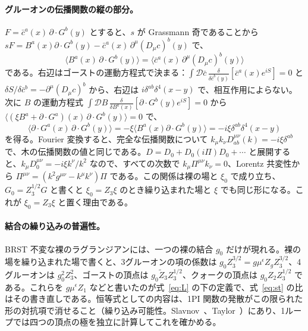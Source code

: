 \documentclass[a4paper,10pt]{ltjsarticle}
\begin{document}
\paragraph{グルーオンの伝播関数の縦の部分。}$F=\bar c^a(x)\,\partial\!\cdot\!G^b(y)$ とすると、$s$ が Grassmann 奇であることから $sF=B^a(x)\partial\!\cdot\!G^b(y)-\bar c^a(x)\,\partial^\mu(D_\mu c)^b(y)$ で、
\begin{equation*}
\langle B^a(x)\,\partial\!\cdot\!G^b(y)\rangle=\langle\bar c^a(x)\,\partial^\mu(D_\mu c)^b(y)\rangle
\end{equation*}
である。右辺はゴーストの運動方程式で決まる：$\int\mathcal D\bar c\,\frac{\delta}{\delta\bar c^b(y)}[\bar c^a(x)e^{iS}]=0$ と $\delta S/\delta\bar c^b=-\partial^\mu(D_\mu c)^b$ から、右辺は $i\delta^{ab}\delta^4(x-y)$ で、相互作用によらない。次に $B$ の運動方程式 $\int\mathcal DB\,\frac{\delta}{\delta B^a(x)}[\partial\!\cdot\!G^b(y)e^{iS}]=0$ から $\langle(\xi B^a+\partial\!\cdot\!G^a)(x)\,\partial\!\cdot\!G^b(y)\rangle=0$ で、
\begin{equation*}
\langle\partial\!\cdot\!G^a(x)\,\partial\!\cdot\!G^b(y)\rangle=-\xi\langle B^a(x)\partial\!\cdot\!G^b(y)\rangle=-i\xi\delta^{ab}\delta^4(x-y)
\end{equation*}
を得る。Fourier 変換すると、完全な伝播関数について $k_\mu k_\nu D^{\mu\nu}_{ab}(k)=-i\xi\delta^{ab}$ で、木の伝播関数の値と同じである。$D=D_0+D_0(i\Pi)D_0+\cdots$ と展開すると、$k_\mu D_0^{\mu\nu}=-i\xi k^\nu/k^2$ なので、すべての次数で $k_\mu\Pi^{\mu\nu}k_\nu=0$、Lorentz 共変性から $\Pi^{\mu\nu}=(k^2g^{\mu\nu}-k^\mu k^\nu)\Pi$ である。この関係は裸の場と $\xi_0$ で成り立ち、$G_0=Z_3^{1/2}G$ と書くと $\xi_0=Z_3\xi$ のとき繰り込まれた場と $\xi$ でも同じ形になる。これが $\xi_0=Z_3\xi$ と置く理由である。

\paragraph{結合の繰り込みの普遍性。}BRST 不変な裸のラグランジアンには、一つの裸の結合 $g_0$ だけが現れる。裸の場を繰り込まれた場で書くと、3グルーオンの項の係数は $g_0Z_3^{3/2}=g\mu^\epsilon Z_gZ_3^{3/2}$、4グルーオンは $g_0^2Z_3^2$、ゴーストの頂点は $g_0\tilde Z_3Z_3^{1/2}$、クォークの頂点は $g_0Z_2Z_3^{1/2}$ である。これらを $g\mu^\epsilon Z_1$ などと書いたのが式~\eqref{eq:L} の下の定義で、式~\eqref{eq:st} の比はその書き直しである。恒等式としての内容は、1PI 関数の発散がこの限られた形の対抗項で消せること（繰り込み可能性。Slavnov~\cite{slavnov}、Taylor~\cite{taylor}）にあり、1ループでは四つの頂点の極を独立に計算してこれを確かめる。
\end{document}

